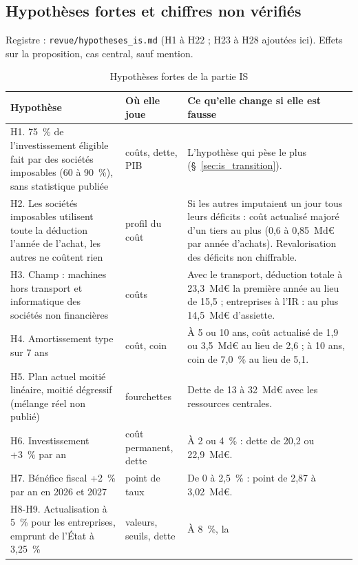 

\subsection{Hypothèses fortes et chiffres non vérifiés}\label{ann:is_hypotheses}

Registre : \texttt{revue/hypotheses\_is.md} (H1 à H22 ; H23 à H28 ajoutées ici). Effets sur la proposition, cas
central, sauf mention.

\begin{table}[!htbp]\centering\scriptsize
\caption{Hypothèses fortes de la partie IS}\label{tab:is_hyp1}
\begin{tabularx}{\linewidth}{@{}>{\raggedright\arraybackslash}p{4.4cm}>{\raggedright\arraybackslash}p{2.4cm}>{\raggedright\arraybackslash}X@{}}
\toprule
Hypothèse & Où elle joue & Ce qu'elle change si elle est fausse \\
\midrule
H1. 75~\% de l'investissement éligible fait par des sociétés imposables (60 à 90~\%), sans statistique publiée & coûts,
dette, PIB & L'hypothèse qui pèse le plus (§~\ref{sec:is_transition}). \\
H2. Les sociétés imposables utilisent toute la déduction l'année de l'achat, les autres ne coûtent rien & profil du
coût & Si les autres imputaient un jour tous leurs déficits : coût actualisé majoré d'un tiers au plus (0,6 à
0,85~Md€ par année d'achats). Revalorisation des déficits non chiffrable. \\
H3. Champ : machines hors transport et informatique des sociétés non financières & coûts & Avec le transport,
déduction totale à 23,3~Md€ la première année au lieu de 15,5 ; entreprises à l'IR : au plus 14,5~Md€ d'assiette. \\
H4. Amortissement type sur 7 ans & coût, coin & À 5 ou 10 ans, coût actualisé de 1,9 ou 3,5~Md€ au lieu de 2,6 ; à 10
ans, coin de 7,0~\% au lieu de 5,1. \\
H5. Plan actuel moitié linéaire, moitié dégressif (mélange réel non publié) & fourchettes & Dette de 13 à 32~Md€ avec
les ressources centrales. \\
H6. Investissement +3~\% par an & coût permanent, dette & À 2 ou 4~\% : dette de 20,2 ou 22,9~Md€. \\
H7. Bénéfice fiscal +2~\% par an en 2026 et 2027 & point de taux & De 0 à 2,5~\% : point de 2,87 à 3,02~Md€. \\
H8-H9. Actualisation à 5~\% pour les entreprises, emprunt de l'État à 3,25~\% & valeurs, seuils, dette & À 8~\%, la

\end{tabularx}
\end{table}
